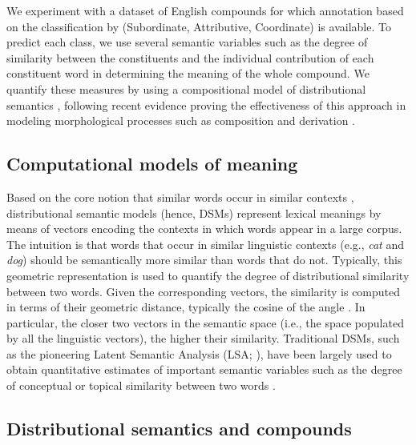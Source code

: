 \documentclass[output=paper]{langsci/langscibook}
\begin{document}
We experiment with a dataset of English compounds for which annotation based on the classification by \cite{SB2005} (Subordinate, Attributive, Coordinate) is available. To predict each class, we use several semantic variables such as the degree of similarity between the constituents and the individual contribution of each constituent word in determining the meaning of the whole compound. We quantify these measures by using a compositional model of distributional semantics \citep{baroni2010,guevara2010,mitchell2010,zanzotto2010}, following recent evidence proving the effectiveness of this approach in modeling morphological processes such as composition and derivation \citep{marelli2015,gunther2016,marelli2017}.

\subsection{Computational models of meaning}

Based on the core notion that similar words occur in similar contexts \citep{harris1954,firth1957}, distributional semantic models (hence, DSMs) represent lexical meanings by means of vectors encoding the contexts in which words appear in a large corpus. The intuition is that words that occur in similar linguistic contexts (e.g., \emph{cat} and \emph{dog}) should be semantically more similar than words that do not. Typically, this geometric representation is used to quantify the degree of distributional similarity between two words. Given the corresponding vectors, the similarity is computed in terms of their geometric distance, typically the cosine of the angle \citep{turney2010}. In particular, the closer two vectors in the semantic space (i.e., the space populated by all the linguistic vectors), the higher their similarity. Traditional DSMs, such as the pioneering Latent Semantic Analysis (LSA; \citealt{landauer1997}), have been largely used to obtain quantitative estimates of important semantic variables such as the degree of conceptual or topical similarity between two words \citep{pado2007,gagnesp2009,kuperman2009,wang2014}.


\subsection{Distributional semantics and compounds}\label{sec:relnew}
\end{document}
